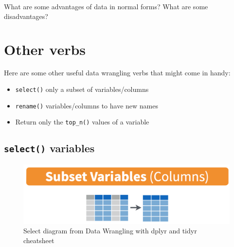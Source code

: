 \documentclass[
  letterpaper,
  DIV=11,
  numbers=noendperiod]{scrreprt}
\providecommand{\tightlist}{%
  \setlength{\itemsep}{0pt}\setlength{\parskip}{0pt}}\usepackage{longtable,booktabs,array}
\theoremstyle{definition}
\theoremstyle{remark}
\begin{document}
\begin{tcolorbox}[enhanced jigsaw, colback=white, toprule=.15mm, bottomrule=.15mm, titlerule=0mm, title={{🎯} Learning Check 3.15}, leftrule=.75mm, arc=.35mm, left=2mm, colframe=quarto-callout-tip-color-frame, coltitle=black, opacitybacktitle=0.6, bottomtitle=1mm, colbacktitle=quarto-callout-tip-color!10!white, opacityback=0, toptitle=1mm, rightrule=.15mm, breakable]

What are some advantages of data in normal forms? What are some
disadvantages?

\end{tcolorbox}

\hypertarget{sec-other-verbs}{%
\section{Other verbs}\label{sec-other-verbs}}

Here are some other useful data wrangling verbs that might come in
handy:

\begin{itemize}
\tightlist
\item
  \texttt{select()} only a subset of variables/columns
\item
  \texttt{rename()} variables/columns to have new names
\item
  Return only the \texttt{top\_n()} values of a variable
\end{itemize}

\hypertarget{sec-select}{%
\subsection{\texorpdfstring{\texttt{select()}
variables}{select() variables}}\label{sec-select}}

\begin{figure}

{\centering \includegraphics{images/select.png}

}

\caption{Select diagram from Data Wrangling with dplyr and tidyr
cheatsheet}

\end{figure}
\end{document}
